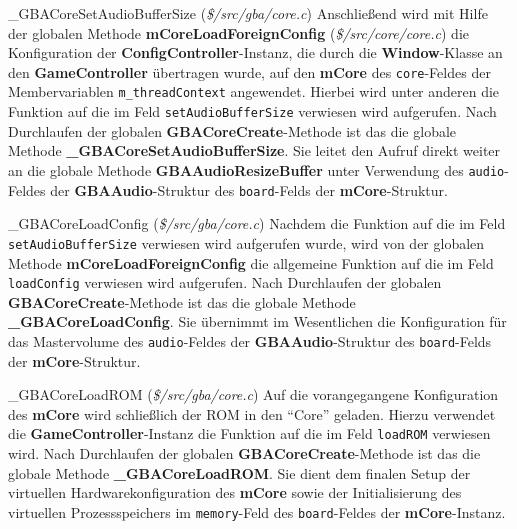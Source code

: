 \documentclass[11pt,a4paper]{scrartcl}
\begin{document}
\large {\_}GBACoreSetAudioBufferSize \normalsize(\textit{\$/src/gba/core.c})
\vspace{2mm}\newline
Anschlie{\ss}end wird mit Hilfe der globalen Methode \textbf{mCoreLoadForeignConfig} (\textit{\$/src/core/core.c}) die Konfiguration der \textbf{ConfigController}-Instanz, die durch die \textbf{Window}-Klasse an den \textbf{GameController} \"ubertragen wurde, auf den \textbf{mCore} des \verb|core|-Feldes der Membervariablen \verb|m_threadContext| angewendet. Hierbei wird unter anderen die Funktion auf die im Feld \verb|setAudioBufferSize| verwiesen wird aufgerufen. Nach Durchlaufen der globalen \textbf{GBACoreCreate}-Methode ist das die globale Methode \textbf{{\_}GBACoreSetAudioBufferSize}. Sie leitet den Aufruf direkt weiter an die globale Methode \textbf{GBAAudioResizeBuffer} unter Verwendung des \verb|audio|-Feldes der \textbf{GBAAudio}-Struktur des \verb|board|-Felds der \textbf{mCore}-Struktur.

\vspace{5mm}
\large {\_}GBACoreLoadConfig \normalsize(\textit{\$/src/gba/core.c})
\vspace{2mm}\newline
Nachdem die Funktion auf die im Feld \verb|setAudioBufferSize| verwiesen wird aufgerufen wurde, wird von der globalen Methode \textbf{mCoreLoadForeignConfig} die allgemeine Funktion auf die im Feld \verb|loadConfig| verwiesen wird aufgerufen. Nach Durchlaufen der globalen \textbf{GBACoreCreate}-Methode ist das die globale Methode \textbf{{\_}GBACoreLoadConfig}. Sie \"ubernimmt im Wesentlichen die Konfiguration f\"ur das Mastervolume des \verb|audio|-Feldes der \textbf{GBAAudio}-Struktur des \verb|board|-Felds der \textbf{mCore}-Struktur.

\vspace{5mm}
\large {\_}GBACoreLoadROM \normalsize(\textit{\$/src/gba/core.c})
\vspace{2mm}\newline
Auf die vorangegangene Konfiguration des \textbf{mCore} wird schlie{\ss}lich der ROM in den \enquote{Core} geladen. Hierzu verwendet die \textbf{GameController}-Instanz die Funktion auf die im Feld \verb|loadROM| verwiesen wird. Nach Durchlaufen der globalen \textbf{GBACoreCreate}-Methode ist das die globale Methode \textbf{{\_}GBACoreLoadROM}. Sie dient dem finalen Setup der virtuellen Hardwarekonfiguration des \textbf{mCore} sowie der Initialisierung des virtuellen Prozessspeichers im \verb|memory|-Feld des \verb|board|-Feldes der \textbf{mCore}-Instanz.
\end{document}
